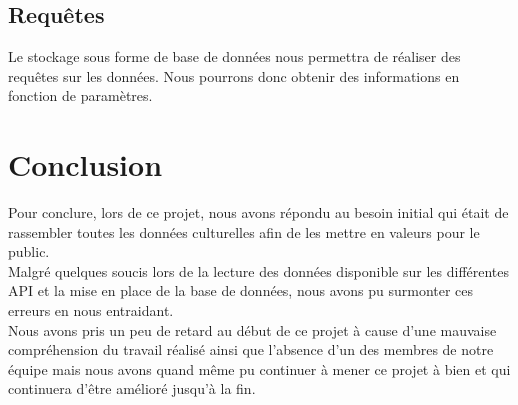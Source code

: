 \documentclass{article}
\begin{document}
\subsection{Requêtes}
Le stockage sous forme de base de données nous permettra de réaliser des requêtes sur les données. Nous pourrons donc obtenir des informations en fonction de paramètres.

\section{Conclusion}
Pour conclure, lors de ce projet, nous avons répondu au besoin initial qui était de rassembler toutes les données culturelles afin de les mettre en valeurs pour le public.\\
Malgré quelques soucis lors de la lecture des données disponible sur les différentes API et la mise en place de la base de données, nous avons pu surmonter ces erreurs en nous entraidant.\\
Nous avons pris un peu de retard au début de ce projet à cause d’une mauvaise compréhension du travail réalisé ainsi que l’absence d’un des membres de notre équipe mais nous avons quand même pu continuer à mener ce projet à bien et qui continuera d’être amélioré jusqu'à la fin.
\end{document}
